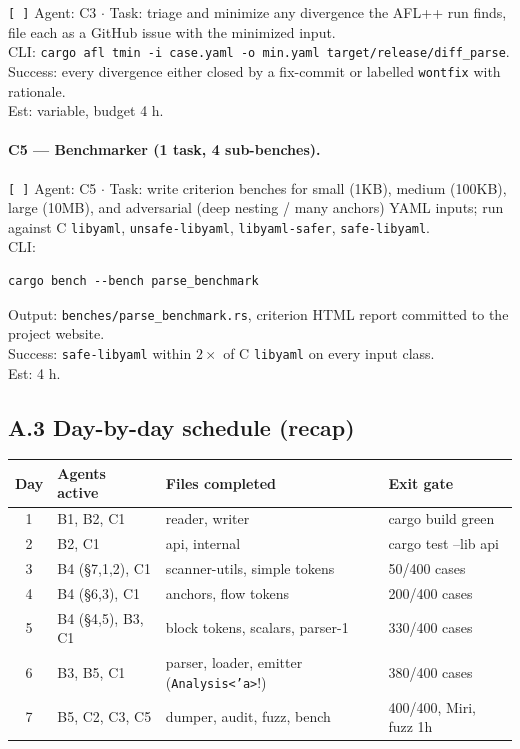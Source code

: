\documentclass[12pt]{article}
\theoremstyle{definition}
\theoremstyle{remark}
\begin{document}
\begin{flushleft}
\texttt{[\,]} Agent: C3 \(\cdot\) Task: triage and minimize any
divergence the AFL++ run finds, file each as a GitHub issue with
the minimized input.
\\
\quad CLI: \texttt{cargo afl tmin -i case.yaml -o min.yaml
target/release/diff\_parse}.
\\
\quad Success: every divergence either closed by a fix-commit or
labelled \texttt{wontfix} with rationale.
\\
\quad Est: variable, budget 4 h.
\end{flushleft}

\paragraph{C5 --- Benchmarker (1 task, 4 sub-benches).}

\begin{flushleft}
\texttt{[\,]} Agent: C5 \(\cdot\) Task: write criterion benches for
small (1KB), medium (100KB), large (10MB), and adversarial (deep
nesting / many anchors) YAML inputs; run against C \texttt{libyaml},
\texttt{unsafe-libyaml}, \texttt{libyaml-safer},
\texttt{safe-libyaml}.
\\
\quad CLI:
\begin{verbatim}
cargo bench --bench parse_benchmark
\end{verbatim}
\quad Output: \texttt{benches/parse\_benchmark.rs}, criterion HTML
report committed to the project website.
\\
\quad Success: \texttt{safe-libyaml} within $2\times$ of C
\texttt{libyaml} on every input class.
\\
\quad Est: 4 h.
\end{flushleft}

\subsection*{A.3 Day-by-day schedule (recap)}

\begin{center}
\footnotesize
\begin{tabular}{|c|l|l|l|}
\hline
\textbf{Day} & \textbf{Agents active} & \textbf{Files completed} & \textbf{Exit gate} \\
\hline
1 & B1, B2, C1            & reader, writer            & cargo build green \\
2 & B2, C1                & api, internal             & cargo test --lib api \\
3 & B4 (\S 7,1,2), C1     & scanner-utils, simple tokens & 50/400 cases \\
4 & B4 (\S 6,3), C1       & anchors, flow tokens      & 200/400 cases \\
5 & B4 (\S 4,5), B3, C1   & block tokens, scalars, parser-1 & 330/400 cases \\
6 & B3, B5, C1            & parser, loader, emitter (\texttt{Analysis<'a>}!) & 380/400 cases \\
7 & B5, C2, C3, C5        & dumper, audit, fuzz, bench & 400/400, Miri, fuzz 1h \\
\hline
\end{tabular}
\end{center}
\end{document}
